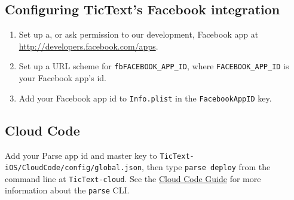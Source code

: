 \subsection{Configuring TicText's Facebook integration}
\begin{enumerate}
	\item Set up a, or ask permission to our development, Facebook app at \url{http://developers.facebook.com/apps}.
	\item Set up a URL scheme for \verb|fbFACEBOOK_APP_ID|, where \verb|FACEBOOK_APP_ID| is your Facebook app's id.
	\item Add your Facebook app id to \verb|Info.plist| in the \verb|FacebookAppID| key.
\end{enumerate}

\subsection{Cloud Code}
Add your Parse app id and master key to \verb|TicText-iOS/CloudCode/config/global.json|, then type \verb|parse deploy| from the command line at \verb|TicText-cloud|. See the \href{https://parse.com/docs/cloud_code_guide#clt}{Cloud Code Guide} for more information about the \verb|parse| CLI.